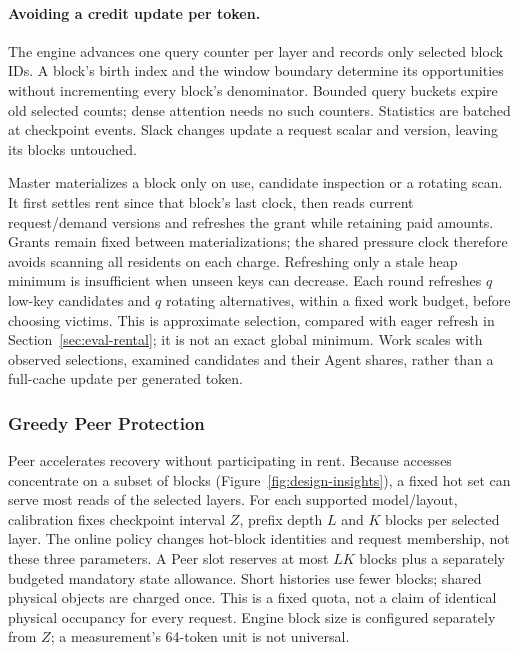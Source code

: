 \paragraph{Avoiding a credit update per token.}
The engine advances one query counter per layer and records only selected
block IDs. A block's birth index and the window boundary determine its
opportunities without incrementing every block's denominator. Bounded
query buckets expire old selected counts; dense attention needs no such
counters. Statistics are batched at checkpoint events. Slack changes
update a request scalar and version, leaving its blocks untouched.

Master materializes a block only on use, candidate inspection or a
rotating scan. It first settles rent since that block's last clock,
then reads current request/demand versions and refreshes the grant while
retaining paid amounts. Grants remain fixed between materializations;
the shared pressure clock therefore avoids scanning all residents on
each charge. Refreshing only a stale heap minimum is insufficient when
unseen keys can decrease. Each round refreshes $q$ low-key candidates
and $q$ rotating alternatives, within a fixed work budget, before choosing
victims. This is approximate selection, compared with eager refresh in
Section~\ref{sec:eval-rental}; it is not an exact global minimum. Work
scales with observed selections, examined candidates and their Agent
shares, rather than a full-cache update per generated token.

\subsubsection{Greedy Peer Protection}
\label{sec:sparse-placement}

Peer accelerates recovery without participating in rent. Because accesses
concentrate on a subset of blocks (Figure~\ref{fig:design-insights}), a
fixed hot set can serve most reads of the selected layers. For each supported
model/layout, calibration fixes checkpoint interval $Z$, prefix depth $L$
and $K$ blocks per selected layer. The online policy changes hot-block
identities and request membership, not these three parameters. A Peer
slot reserves at most $LK$ blocks plus a separately budgeted mandatory
state allowance. Short histories use fewer blocks; shared physical
objects are charged once. This is a fixed quota, not a claim of identical
physical occupancy for every request. Engine block size is configured
separately from $Z$; a measurement's 64-token unit is not universal.

